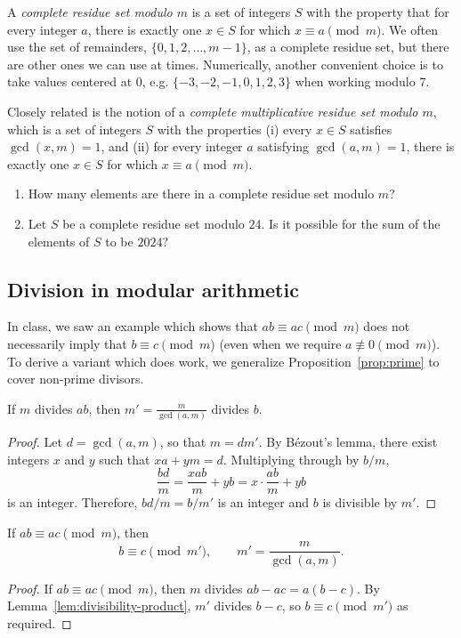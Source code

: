 A \emph{complete residue set modulo $m$} is a set of integers $S$ with the property that for every integer $a$, there is exactly one $x\in S$ for which $x\equiv a\pmod{m}$. We often use the set of remainders, $\{0, 1, 2, \ldots, m - 1\}$, as a complete residue set, but there are other ones we can use at times. Numerically, another convenient choice is to take values centered at 0, e.g. $\{-3, -2, -1, 0, 1, 2, 3\}$ when working modulo 7.

Closely related is the notion of a \emph{complete multiplicative residue set modulo $m$}, which is a set of integers $S$ with the properties (i) every $x\in S$ satisfies $\gcd(x,m) = 1$, and (ii) for every integer $a$ satisfying $\gcd(a,m) = 1$, there is exactly one $x\in S$ for which $x\equiv a\pmod{m}$.

\begin{enumerate}
\item How many elements are there in a complete residue set modulo $m$?
\item Let $S$ be a complete residue set modulo $24$. Is it possible for the sum of the elements of $S$ to be $2024$?
\end{enumerate}


\subsection{Division in modular arithmetic}

In class, we saw an example which shows that $ab\equiv ac\pmod{m}$ does not necessarily imply that $b\equiv c\pmod{m}$ (even when we require $a\not\equiv 0\pmod{m}$). To derive a variant which does work, we generalize Proposition~\ref{prop:prime} to cover non-prime divisors.

\begin{lemma}\label{lem:divisibility-product}
If $m$ divides $ab$, then $m' = \frac{m}{\gcd(a,m)}$ divides $b$.
\end{lemma}
\begin{proof}
Let $d = \gcd(a,m)$, so that $m = dm'$. By B\'{e}zout's lemma, there exist integers $x$ and $y$ such that $xa + ym = d$. Multiplying through by $b/m$,
\begin{equation*}
\frac{bd}{m} = \frac{xab}{m} + yb = x\cdot\frac{ab}{m} + yb
\end{equation*}
is an integer. Therefore, $bd/m = b/m'$ is an integer and $b$ is divisible by $m'$.
\end{proof}

\begin{proposition}\label{prop:mod-arith-divide}
If $ab\equiv ac\pmod{m}$, then
\begin{equation*}
b\equiv c\pmod{m'},\qquad m' = \frac{m}{\gcd(a,m)}.
\end{equation*}
\end{proposition}
\begin{proof}
If $ab\equiv ac\pmod{m}$, then $m$ divides $ab - ac = a(b - c)$. By Lemma~\ref{lem:divisibility-product}, $m'$ divides $b - c$, so $b\equiv c\pmod{m'}$ as required.
\end{proof}


